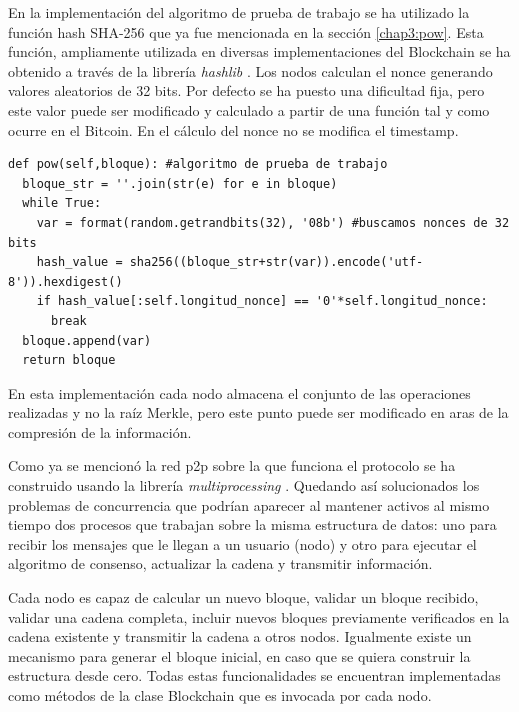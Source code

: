En la implementación del algoritmo de prueba de trabajo se ha utilizado la función hash SHA-256 que ya fue mencionada en la sección \ref{chap3:pow}. Esta función, ampliamente utilizada en diversas implementaciones del Blockchain se ha obtenido a través de la librería \textit{hashlib} \citep{hashlib}. Los nodos calculan el nonce generando valores aleatorios de 32 bits. Por defecto se ha puesto una dificultad fija, pero este valor puede ser modificado y calculado a partir de una función tal y como ocurre en el Bitcoin. En el cálculo del nonce no se modifica el timestamp.
\lstset{language=Python}
\lstset{frame=lines}
\lstset{basicstyle=\footnotesize}
\begin{lstlisting}[title=Algoritmo de prueba de trabajo]
def pow(self,bloque): #algoritmo de prueba de trabajo
  bloque_str = ''.join(str(e) for e in bloque)
  while True:
    var = format(random.getrandbits(32), '08b') #buscamos nonces de 32 bits
    hash_value = sha256((bloque_str+str(var)).encode('utf-8')).hexdigest()
    if hash_value[:self.longitud_nonce] == '0'*self.longitud_nonce:
      break
  bloque.append(var)
  return bloque
\end{lstlisting}


En esta implementación cada nodo almacena el conjunto de las operaciones realizadas y no la raíz Merkle, pero este punto puede ser modificado en aras de la compresión de la información.

Como ya se mencionó la red p2p sobre la que funciona el protocolo se ha construido usando la librería \textit{multiprocessing} \citep{multiprocessing}. Quedando así solucionados los problemas de concurrencia que podrían aparecer al mantener activos al mismo tiempo dos procesos que trabajan sobre la misma estructura de datos: uno para recibir los mensajes que le llegan a un usuario (nodo) y otro para ejecutar el algoritmo de consenso, actualizar la cadena y transmitir información.

Cada nodo es capaz de calcular un nuevo bloque, validar un bloque recibido, validar una cadena completa, incluir nuevos bloques previamente verificados en la cadena existente y transmitir la cadena a otros nodos. Igualmente existe un mecanismo para generar el bloque inicial, en caso que se quiera construir la estructura desde cero. Todas estas funcionalidades se encuentran implementadas como métodos de la clase Blockchain que es invocada por cada nodo.

